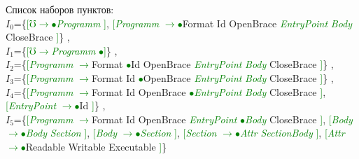 \documentclass[a0]{a0poster}
\begin{document}
  
Список наборов пунктов:\\
$I_{0}$=\{\textcolor{Green}{[}\textcolor{Green}{$\mho$}\textcolor{Green}{$\to$}\textcolor{Green}{$\bullet$}\textcolor{Green}{\textit{Programm}} \textcolor{Green}{]}, \textcolor{Green}{[}\textcolor{Green}{\textit{Programm}} \textcolor{Green}{$\to$}\textcolor{Green}{$\bullet$}Format Id OpenBrace \textcolor{Green}{\textit{EntryPoint}} \textcolor{Green}{\textit{Body}} CloseBrace \textcolor{Green}{]}\}
,\\
$I_{1}$=\{\textcolor{Green}{[}\textcolor{Green}{$\mho$}\textcolor{Green}{$\to$}\textcolor{Green}{\textit{Programm}} \textcolor{Green}{$\bullet$}\textcolor{Green}{]}\}
,\\
$I_{2}$=\{\textcolor{Green}{[}\textcolor{Green}{\textit{Programm}} \textcolor{Green}{$\to$}Format \textcolor{Green}{$\bullet$}Id OpenBrace \textcolor{Green}{\textit{EntryPoint}} \textcolor{Green}{\textit{Body}} CloseBrace \textcolor{Green}{]}\}
,\\
$I_{3}$=\{\textcolor{Green}{[}\textcolor{Green}{\textit{Programm}} \textcolor{Green}{$\to$}Format Id \textcolor{Green}{$\bullet$}OpenBrace \textcolor{Green}{\textit{EntryPoint}} \textcolor{Green}{\textit{Body}} CloseBrace \textcolor{Green}{]}\}
,\\
$I_{4}$=\{\textcolor{Green}{[}\textcolor{Green}{\textit{Programm}} \textcolor{Green}{$\to$}Format Id OpenBrace \textcolor{Green}{$\bullet$}\textcolor{Green}{\textit{EntryPoint}} \textcolor{Green}{\textit{Body}} CloseBrace \textcolor{Green}{]}, \textcolor{Green}{[}\textcolor{Green}{\textit{EntryPoint}} \textcolor{Green}{$\to$}\textcolor{Green}{$\bullet$}Id \textcolor{Green}{]}\}
,\\
$I_{5}$=\{\textcolor{Green}{[}\textcolor{Green}{\textit{Programm}} \textcolor{Green}{$\to$}Format Id OpenBrace \textcolor{Green}{\textit{EntryPoint}} \textcolor{Green}{$\bullet$}\textcolor{Green}{\textit{Body}} CloseBrace \textcolor{Green}{]}, \textcolor{Green}{[}\textcolor{Green}{\textit{Body}} \textcolor{Green}{$\to$}\textcolor{Green}{$\bullet$}\textcolor{Green}{\textit{Body}} \textcolor{Green}{\textit{Section}} \textcolor{Green}{]}, \textcolor{Green}{[}\textcolor{Green}{\textit{Body}} \textcolor{Green}{$\to$}\textcolor{Green}{$\bullet$}\textcolor{Green}{\textit{Section}} \textcolor{Green}{]}, \textcolor{Green}{[}\textcolor{Green}{\textit{Section}} \textcolor{Green}{$\to$}\textcolor{Green}{$\bullet$}\textcolor{Green}{\textit{Attr}} \textcolor{Green}{\textit{SectionBody}} \textcolor{Green}{]}, \textcolor{Green}{[}\textcolor{Green}{\textit{Attr}} \textcolor{Green}{$\to$}\textcolor{Green}{$\bullet$}Readable Writable Executable \textcolor{Green}{]}\}
\end{document}
